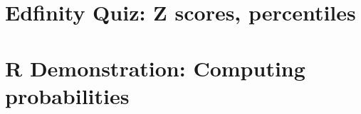 \documentclass[slidestop,compress,mathserif]{beamer}
\makeatletter
\newcommand{\soln}[1]{\textit{#1}}
\def\chpiv@path{../../Chp 4}
\makeatother
\begin{document}

\section{Edfinity Quiz: Z scores, percentiles}


\section{R Demonstration: Computing probabilities}





\end{document}
